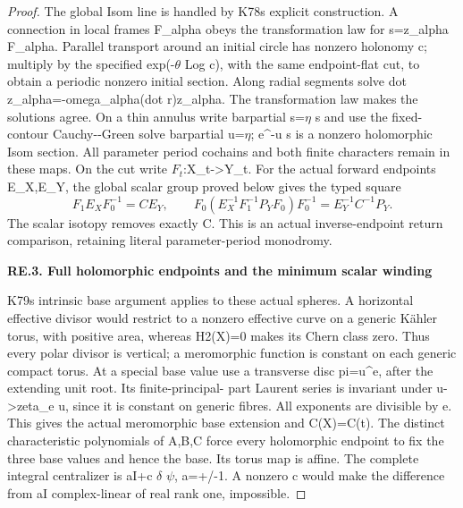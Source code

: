 \begin{proof}
The global Isom line is handled by K78\textquotesingle s explicit construction. A
connection in local frames F\_alpha obeys the transformation law for
s=z\_alpha F\_alpha. Parallel transport around an initial circle has
nonzero holonomy c; multiply by the specified exp(-\(\theta\) Log c), with
the same endpoint-flat cut, to obtain a periodic nonzero initial section.
Along radial segments solve dot z\_alpha=-omega\_alpha(dot r)z\_alpha.
The transformation law makes the solutions agree. On a thin annulus
write barpartial s=\(\eta\) s and use the fixed-contour Cauchy-\/-Green solve
barpartial u=\(\eta\); e\^{}-u s is a nonzero holomorphic Isom section. All
parameter period cochains and both finite characters remain in these
maps. On the cut write \(F_t\):X\_t-\textgreater Y\_t. For the actual forward endpoints
E\_X,E\_Y, the global scalar group proved below gives the typed square
\[
F_1E_XF_0^{-1}=C E_Y,\qquad
F_0(E_X^{-1}F_1^{-1}P_YF_0)F_0^{-1}=E_Y^{-1}C^{-1}P_Y.
\tag{RE.12}
\]
The scalar isotopy removes exactly C. This is an actual inverse-endpoint
return comparison, retaining literal parameter-period monodromy.

\par

\medskip\noindent\textbf{RE.3. Full holomorphic endpoints and the minimum scalar winding}

\par\nobreak

K79\textquotesingle s intrinsic base argument applies to these actual spheres. A horizontal
effective divisor would restrict to a nonzero effective curve on a generic
Kähler torus, with positive area, whereas H2(X)=0 makes its Chern class
zero. Thus every polar divisor is vertical; a meromorphic function is
constant on each generic compact torus. At a special base value use a
transverse disc pi=u\^{}e, after the extending unit root. Its finite-principal-
part Laurent series is invariant under u-\textgreater zeta\_e u, since it is constant
on generic fibres. All exponents are divisible by e. This gives the actual
meromorphic base extension and C(X)=C(t). The distinct characteristic
polynomials of A,B,C force every holomorphic endpoint to fix the three
base values and hence the base. Its torus map is affine. The complete
integral centralizer is aI+c \(\delta\) \(\psi\), a=+/-1. A nonzero c would make
the difference from aI complex-linear of real rank one, impossible.


\end{proof}
